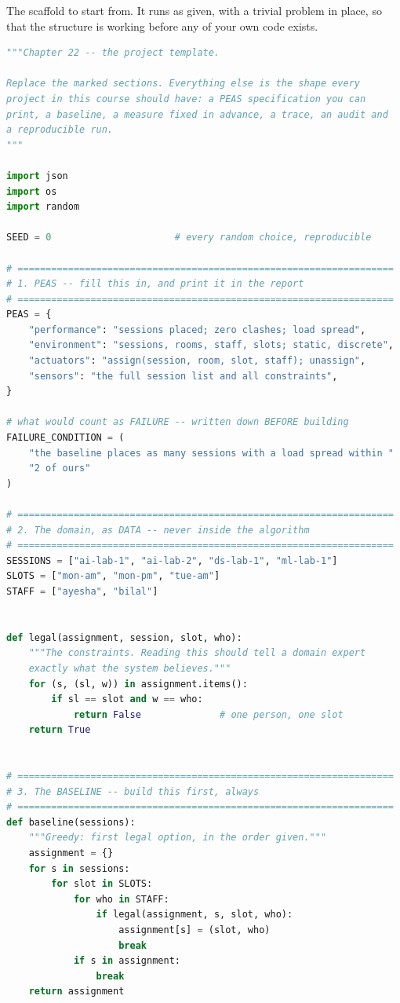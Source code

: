 \begin{lab}
The scaffold to start from. It runs as given, with a trivial problem in place, so
that the structure is working before any of your own code exists.
\begin{lstlisting}[language=Python]
"""Chapter 22 -- the project template.

Replace the marked sections. Everything else is the shape every
project in this course should have: a PEAS specification you can
print, a baseline, a measure fixed in advance, a trace, an audit and
a reproducible run.
"""

import json
import os
import random

SEED = 0                      # every random choice, reproducible

# ===================================================================
# 1. PEAS -- fill this in, and print it in the report
# ===================================================================
PEAS = {
    "performance": "sessions placed; zero clashes; load spread",
    "environment": "sessions, rooms, staff, slots; static, discrete",
    "actuators": "assign(session, room, slot, staff); unassign",
    "sensors": "the full session list and all constraints",
}

# what would count as FAILURE -- written down BEFORE building
FAILURE_CONDITION = (
    "the baseline places as many sessions with a load spread within "
    "2 of ours"
)

# ===================================================================
# 2. The domain, as DATA -- never inside the algorithm
# ===================================================================
SESSIONS = ["ai-lab-1", "ai-lab-2", "ds-lab-1", "ml-lab-1"]
SLOTS = ["mon-am", "mon-pm", "tue-am"]
STAFF = ["ayesha", "bilal"]


def legal(assignment, session, slot, who):
    """The constraints. Reading this should tell a domain expert
    exactly what the system believes."""
    for (s, (sl, w)) in assignment.items():
        if sl == slot and w == who:
            return False              # one person, one slot
    return True


# ===================================================================
# 3. The BASELINE -- build this first, always
# ===================================================================
def baseline(sessions):
    """Greedy: first legal option, in the order given."""
    assignment = {}
    for s in sessions:
        for slot in SLOTS:
            for who in STAFF:
                if legal(assignment, s, slot, who):
                    assignment[s] = (slot, who)
                    break
            if s in assignment:
                break
    return assignment



\end{lstlisting}
\end{lab}
